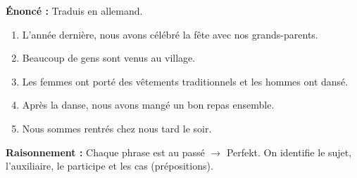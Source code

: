 \documentclass[11pt]{article}
\begin{document}
\begin{exoresolu}
\textbf{Énoncé :} Traduis en allemand.

\begin{enumerate}
\item L'année dernière, nous avons célébré la fête avec nos grands-parents.
\item Beaucoup de gens sont venus au village.
\item Les femmes ont porté des vêtements traditionnels et les hommes ont dansé.
\item Après la danse, nous avons mangé un bon repas ensemble.
\item Nous sommes rentrés chez nous tard le soir.
\end{enumerate}
\tcblower
\textbf{Raisonnement :} Chaque phrase est au passé $\rightarrow$ Perfekt. On identifie le sujet, l'auxiliaire, le participe et les cas (prépositions).


\end{exoresolu}
\end{document}
